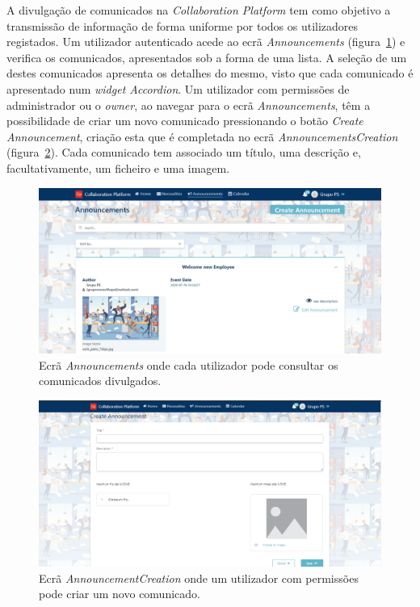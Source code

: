 A divulgação de comunicados na \textit{Collaboration Platform} tem como objetivo a transmissão de informação de forma uniforme por todos os utilizadores registados.
Um utilizador autenticado acede ao ecrã \textit{Announcements} (figura~\ref{fig:announcements}) e verifica os comunicados, apresentados sob a forma de uma lista. 
A seleção de um destes comunicados apresenta os detalhes do mesmo, visto que cada comunicado é apresentado num \textit{widget Accordion}. 
Um utilizador com permissões de administrador ou o \textit{owner}, ao navegar para o ecrã \textit{Announcements}, têm a possibilidade de criar um novo comunicado pressionando o botão \textit{Create Announcement}, criação esta que é completada no ecrã \textit{AnnouncementsCreation} (figura~\ref{fig:announcement_creation}).
Cada comunicado tem associado um título, uma descrição e, facultativamente, um ficheiro e uma imagem.

\begin{figure}[H]
  \centering 
  \includegraphics[scale=0.4]{figures/Announcements.png}
  \caption{Ecrã \textit{Announcements} onde cada utilizador pode consultar os comunicados divulgados.}\label{fig:announcements}
\end{figure}



\begin{figure}[H]
  \centering 
  \includegraphics[scale=0.4]{figures/AnnouncementCreation.png}
  \caption{Ecrã \textit{AnnouncementCreation} onde um utilizador com permissões pode criar um novo comunicado.}\label{fig:announcement_creation}
\end{figure}



